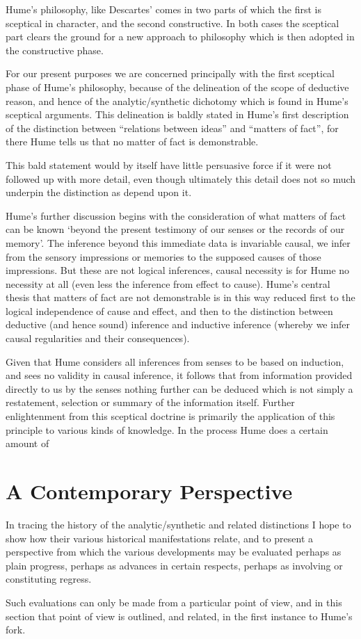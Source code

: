 Hume's philosophy, like Descartes' comes in two parts of which the
first is sceptical in character, and the second constructive.
In both cases the sceptical part clears the ground for a new approach
to philosophy which is then adopted in the constructive phase.

For our present purposes we are concerned principally with the first
sceptical phase of Hume's philosophy, because of the delineation of the scope
of deductive reason, and hence of the analytic/synthetic dichotomy
which is found in Hume's sceptical arguments.
This delineation is baldly stated in Hume's first description of the
distinction between ``relations between ideas'' and ``matters of
fact'', for there Hume tells us that no matter of fact is
demonstrable.

This bald statement would by itself have little persuasive force if it
were not followed up with more detail, even though ultimately this
detail does not so much underpin the distinction as depend upon it.

Hume's further discussion begins with the consideration of what
matters of fact can be known `beyond the present testimony of 
our senses or the records of our memory'.
The inference beyond this immediate data is invariable causal, we
infer from the sensory impressions or memories to the supposed causes
of those impressions.
But these are not logical inferences, causal necessity is for Hume no
necessity at all (even less the inference from effect to cause).
Hume's central thesis that matters of fact are not demonstrable is
in this way reduced first to the logical independence of cause and
effect, and then to the distinction between deductive (and hence sound)
inference and inductive inference (whereby we infer causal
regularities and their consequences).

Given that Hume considers all inferences from senses to be based on
induction, and sees no validity in causal inference, it follows that
from information provided directly to us by the senses nothing further
can be deduced which is not simply a restatement, selection or summary
of the information itself.
Further enlightenment from this sceptical doctrine is primarily the
application of this principle to various kinds of knowledge.
In the process Hume does a certain amount of 



\section{A Contemporary Perspective}

In tracing the history of the analytic/synthetic and related
distinctions I hope to show how their various historical
manifestations relate, and to present a perspective from which the
various developments may be evaluated perhaps as plain progress,
perhaps as advances in certain respects, perhaps as involving or
constituting regress.

Such evaluations can only be made from a particular point of view, and
in this section that point of view is outlined, and related, in the
first instance to Hume's fork.






